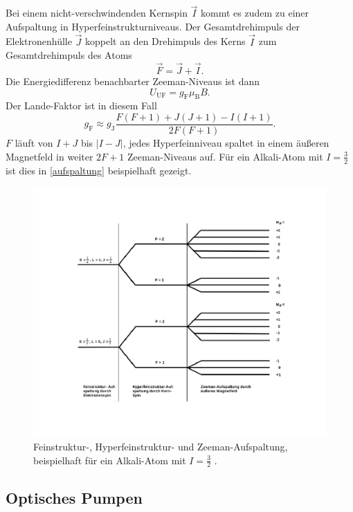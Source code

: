 Bei einem nicht-verschwindenden Kernspin $\vec{I}$ kommt es zudem zu einer Aufspaltung in Hyperfeinstrukturniveaus.
Der Gesamtdrehimpuls der Elektronenhülle $\vec{J}$ koppelt an den Drehimpuls des Kerns $\vec{I}$ zum Gesamtdrehimpuls des Atoms
\begin{equation}
  \vec{F} = \vec{J} + \vec{I}.
\end{equation}
Die Energiedifferenz benachbarter Zeeman-Niveaus ist dann
\begin{equation}
  U_\text{UF} = g_\text{F}\mu_\text{B}B.
\end{equation}
Der Lande-Faktor ist in diesem Fall
\begin{equation}
  g_\text{F} \approx g_\text{J}\frac{F(F+1)+J(J+1)-I(I+1)}{2F(F+1)}.
\end{equation}
$F$ läuft von $I+J$ bis $|I-J|$, jedes Hyperfeinniveau spaltet in einem äußeren Magnetfeld in weiter $2F+1$ Zeeman-Niveaus
auf. Für ein Alkali-Atom mit $I=\frac{3}{2}$ ist dies in \autoref{aufspaltung} beispielhaft gezeigt.
\begin{figure}
  \centering
  \includegraphics[width=\textwidth]{img/aufspaltung.pdf}
  \caption{Feinstruktur-, Hyperfeinstruktur- und Zeeman-Aufspaltung, beispielhaft für ein Alkali-Atom mit
  $I=\frac{3}{2}$ \cite{FP}.}
  \label{aufspaltung}
\end{figure}

\subsection{Optisches Pumpen}

